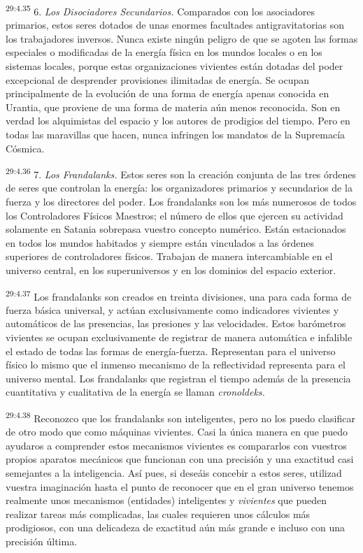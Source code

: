 \par
\textsuperscript{29:4.35} 6. \textit{Los Disociadores Secundarios.} Comparados con los asociadores primarios, estos seres dotados de unas enormes facultades antigravitatorias son los trabajadores inversos. Nunca existe ningún peligro de que se agoten las formas especiales o modificadas de la energía física en los mundos locales o en los sistemas locales, porque estas organizaciones vivientes están dotadas del poder excepcional de desprender provisiones ilimitadas de energía. Se ocupan principalmente de la evolución de una forma de energía apenas conocida en Urantia, que proviene de una forma de materia aún menos reconocida. Son en verdad los alquimistas del espacio y los autores de prodigios del tiempo. Pero en todas las maravillas que hacen, nunca infringen los mandatos de la Supremacía Cósmica.

\par
\textsuperscript{29:4.36} 7. \textit{Los Frandalanks.} Estos seres son la creación conjunta de las tres órdenes de seres que controlan la energía: los organizadores primarios y secundarios de la fuerza y los directores del poder. Los frandalanks son los más numerosos de todos los Controladores Físicos Maestros; el número de ellos que ejercen su actividad solamente en Satania sobrepasa vuestro concepto numérico. Están estacionados en todos los mundos habitados y siempre están vinculados a las órdenes superiores de controladores físicos. Trabajan de manera intercambiable en el universo central, en los superuniversos y en los dominios del espacio exterior.

\par
\textsuperscript{29:4.37} Los frandalanks son creados en treinta divisiones, una para cada forma de fuerza básica universal, y actúan exclusivamente como indicadores vivientes y automáticos de las presencias, las presiones y las velocidades. Estos barómetros vivientes se ocupan exclusivamente de registrar de manera automática e infalible el estado de todas las formas de energía-fuerza. Representan para el universo físico lo mismo que el inmenso mecanismo de la reflectividad representa para el universo mental. Los frandalanks que registran el tiempo además de la presencia cuantitativa y cualitativa de la energía se llaman \textit{cronoldeks.}

\par
\textsuperscript{29:4.38} Reconozco que los frandalanks son inteligentes, pero no los puedo clasificar de otro modo que como máquinas vivientes. Casi la única manera en que puedo ayudaros a comprender estos mecanismos vivientes es compararlos con vuestros propios aparatos mecánicos que funcionan con una precisión y una exactitud casi semejantes a la inteligencia. Así pues, si deseáis concebir a estos seres, utilizad vuestra imaginación hasta el punto de reconocer que en el gran universo tenemos realmente unos mecanismos (entidades) inteligentes y \textit{vivientes} que pueden realizar tareas más complicadas, las cuales requieren unos cálculos más prodigiosos, con una delicadeza de exactitud aún más grande e incluso con una precisión última.

